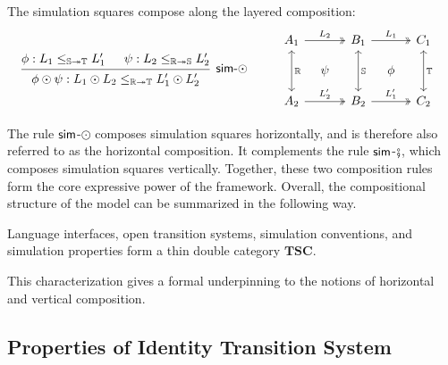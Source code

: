 \begin{theorem}
  The simulation squares compose along the layered composition:
  \[
    \begin{prooftree}
      \hypo{\phi: L_1 \le_{\mathbb{S} \twoheadrightarrow \mathbb{T}} L'_1}
      \hypo{\psi: L_2 \le_{\mathbb{R} \twoheadrightarrow \mathbb{S}} L'_2}
      \infer2[\kw{sim}-$\odot$]{\phi \odot \psi: L_1 \odot L_2 \le_{\mathbb{R} \twoheadrightarrow \mathbb{T}} L'_1 \odot L'_2}
    \end{prooftree}
    \qquad
    \begin{array}{c}
      \begin{tikzcd}[row sep=2ex, column sep=2ex]
        A_1 \ar[rr, twoheadrightarrow, "L_2"]
        \ar[dd, leftrightarrow, "\mathbb{R}"]
        && B_1 \ar[rr, twoheadrightarrow, "L_1"]
        \ar[dd, leftrightarrow, "\mathbb{S}"]
        && C_1
        \ar[dd, leftrightarrow, "\mathbb{T}"]
        \\
        & \psi && \phi
        \\
        A_2 \ar[rr, twoheadrightarrow, "L'_2"] && B_2 \ar[rr, twoheadrightarrow, "L'_1"] && C_2
      \end{tikzcd}
    \end{array}
  \]
\end{theorem}

The rule $ \mathsf{sim} $-$\odot$
composes simulation squares horizontally,
and is therefore also referred to as the horizontal composition.
It complements the rule $ \mathsf{sim} $-$\fatsemi$,
which composes simulation squares vertically.
Together,
these two composition rules
form the core expressive power of the framework.
Overall,
the compositional structure of the model
can be summarized in the following way.
\begin{theorem}
  \label{thm:ox:tsc}
  Language interfaces,
  open transition systems,
  simulation conventions,
  and simulation properties
  form a thin double category $\mathbf{TSC}$.
\end{theorem}

This characterization
gives a formal underpinning
to the notions of horizontal and vertical composition.

\subsection{Properties of Identity Transition System}

